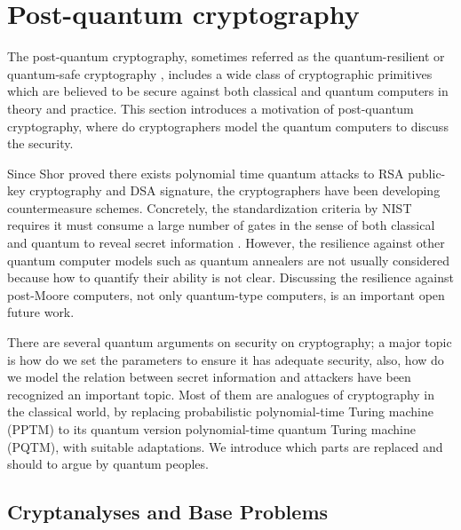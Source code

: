 


\newcommand{\memo}[1]{{\color{red} #1 }}

%



\clearpage

\section{Post-quantum cryptography}


The post-quantum cryptography, sometimes referred as the quantum-resilient or quantum-safe cryptography \cite{NISTpq}, includes a wide class of cryptographic primitives which are believed to be secure against both classical and quantum computers in theory and practice.
This section introduces a motivation of post-quantum cryptography, where do cryptographers model the quantum computers to discuss the security.

Since Shor \cite{Shor97} proved there exists polynomial time 
quantum attacks to RSA public-key cryptography and DSA signature,
the cryptographers have been developing countermeasure schemes.
Concretely, the standardization criteria by NIST requires it must consume a large number of gates in the sense of both classical and quantum to reveal secret information \cite[p.18]{NISTpq}.
However, the resilience against other quantum computer models such as quantum annealers are not usually considered because how to quantify their ability is not clear.
Discussing the resilience against post-Moore computers\cite{MM11}, not only quantum-type computers, is an important open future work.

There are several quantum arguments on security on cryptography;
a major topic is how do we set the parameters to ensure it has adequate security,
also, how do we model the relation between secret information and attackers have been recognized an important topic.
Most of them are analogues of cryptography in the classical world, by replacing probabilistic polynomial-time Turing machine (PPTM) to its quantum version
polynomial-time quantum Turing machine (PQTM), with suitable adaptations.
We introduce which parts are replaced and should to argue by quantum peoples.

\subsection{Cryptanalyses and Base Problems}

